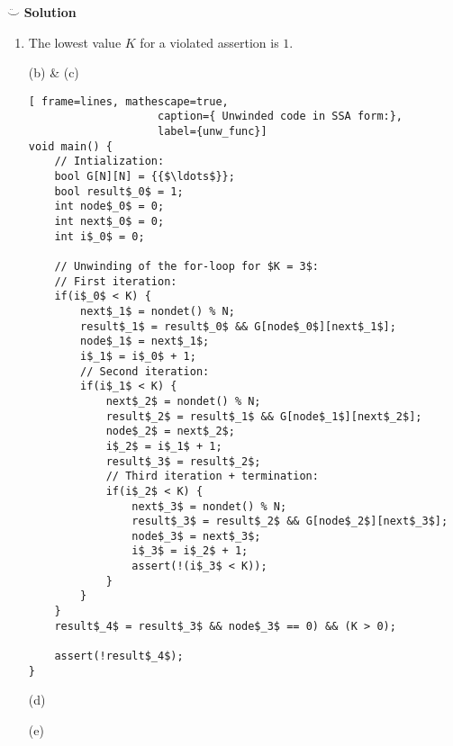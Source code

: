 $\ddot\smile$ \textbf{Solution}\\
\begin{enumerate}
\item
The lowest value $K$ for a violated assertion is $1$.

\item[(b) \& (c)] \quad
\medskip
\begin{lstlisting}[	frame=lines, mathescape=true,
					caption={ Unwinded code in SSA form:},
					label={unw_func}]
void main() {
	// Intialization:
	bool G[N][N] = {{$\ldots$}};
	bool result$_0$ = 1;
	int node$_0$ = 0;
	int next$_0$ = 0;
	int i$_0$ = 0;
	
	// Unwinding of the for-loop for $K = 3$:
	// First iteration:
	if(i$_0$ < K) {
		next$_1$ = nondet() % N;
		result$_1$ = result$_0$ && G[node$_0$][next$_1$];
		node$_1$ = next$_1$;
		i$_1$ = i$_0$ + 1;
		// Second iteration:
		if(i$_1$ < K) {
			next$_2$ = nondet() % N;
			result$_2$ = result$_1$ && G[node$_1$][next$_2$];
			node$_2$ = next$_2$;
			i$_2$ = i$_1$ + 1;
			result$_3$ = result$_2$;
			// Third iteration + termination:
			if(i$_2$ < K) {
				next$_3$ = nondet() % N;
				result$_3$ = result$_2$ && G[node$_2$][next$_3$];
				node$_3$ = next$_3$;
				i$_3$ = i$_2$ + 1;
				assert(!(i$_3$ < K));
			}
		}
	}
	result$_4$ = result$_3$ && node$_3$ == 0) && (K > 0);

	assert(!result$_4$);
}
\end{lstlisting}

\item[(d)]
\item[(e)]
\end{enumerate}